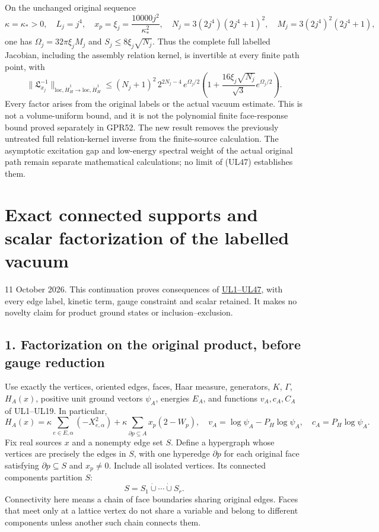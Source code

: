 \documentclass[11pt]{article}
\begin{document}
On the unchanged original sequence
\[
 \kappa=\kappa_*>0,\quad L_j=j^4,\quad
 x_p=\xi_j=\frac{10000j^2}{\kappa_*^2},\quad
 N_j=3(2j^4)(2j^4+1)^2,\quad M_j=3(2j^4)^2(2j^4+1),
 \tag{UL46}
\]
one has \(\Omega_j=32\pi\xi_jM_j\) and \(S_j\le8\xi_j\sqrt{N_j}\). Thus the complete full labelled Jacobian, including the assembly relation kernel, is invertible at every finite path point, with
\[
 \|\mathfrak L_{x_j}^{-1}\|_{\mathrm{loc},\dot H^1_H\to
                                      \mathrm{loc},\dot H^1_H}
 \le (N_j+1)^2\,2^{2N_j-4}\,
          e^{\Omega_j/2}
       \left(1+\frac{16\xi_j\sqrt{N_j}}{\sqrt3}e^{\Omega_j/2}\right).
 \tag{UL47}
\]
Every factor arises from the original labels or the actual vacuum estimate. This is not a volume-uniform bound, and it is not the polynomial finite face-response bound proved separately in GPR52. The new result removes the previously untreated full relation-kernel inverse from the finite-source calculation. The asymptotic excitation gap and low-energy spectral weight of the actual original path remain separate mathematical calculations; no limit of (UL47) establishes them.
\clearpage
\section*{Exact connected supports and scalar factorization of the labelled vacuum}

11 October 2026. This continuation proves consequences of \href{https://github.com/KokunoYumeto/yang-mills-interacting-workbench/blob/main/yang-mills/continuations/20261011-central-signs-shrinking-window/union_label_global/FULL_UNION_LABEL_INVERSE.md}{UL1–UL47}, with every edge label, kinetic term, gauge constraint and scalar retained. It makes no novelty claim for product ground states or inclusion–exclusion.

\subsection*{1. Factorization on the original product, before gauge reduction}

Use exactly the vertices, oriented edges, faces, Haar measure, generators, \(K\), \(\Gamma\), \(H_A(x)\), positive unit ground vectors \(\psi_A\), energies \(E_A\), and functions \(v_A,c_A,C_A\) of UL1–UL19. In particular,
\[
H_A(x)=\kappa\sum_{e\in E,\alpha}(-X_{e,\alpha}^2)
 +\kappa\sum_{\partial p\subseteq A}x_p(2-W_p),
\quad
v_A=\log\psi_A-P_H\log\psi_A,
\quad c_A=P_H\log\psi_A.
\tag{UF1}
\]
Fix real sources \(x\) and a nonempty edge set \(S\). Define a hypergraph whose vertices are precisely the edges in \(S\), with one hyperedge \(\partial p\) for each original face satisfying \(\partial p\subseteq S\) and \(x_p\ne0\). Include all isolated vertices. Its connected components partition \(S\):
\[
S=S_1\mathbin{\dot\cup}\cdots\mathbin{\dot\cup}S_r.
\tag{UF2}
\]
Connectivity here means a chain of face boundaries sharing original edges. Faces that meet only at a lattice vertex do not share a variable and belong to different components unless another such chain connects them.
\end{document}
